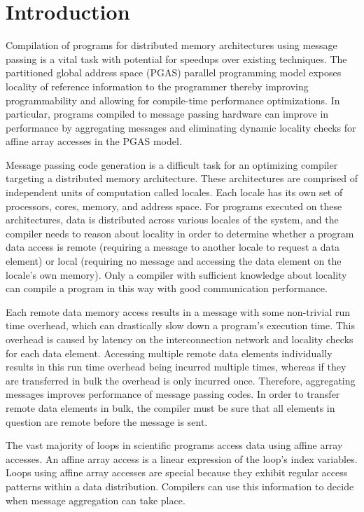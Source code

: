 \section{Introduction}\label{sec:intro} 

Compilation of programs for distributed memory architectures using message passing is a vital task with potential for speedups over existing techniques. The partitioned global address space (PGAS) parallel programming model exposes locality of reference information to the programmer thereby improving programmability and allowing for compile-time performance optimizations. In particular, programs compiled to message passing hardware can improve in performance by aggregating messages and eliminating dynamic locality checks for affine array accesses in the PGAS model. 

Message passing code generation is a difficult task for an optimizing compiler targeting a distributed memory architecture. These architectures are comprised of independent units of computation called locales. Each locale has its own set of processors, cores, memory, and address space. For programs executed on these architectures, data is distributed across various locales of the system, and the compiler needs to reason about locality in order to determine whether a program data access is remote (requiring a message to another locale to request a data element) or local (requiring no message and accessing the data element on the locale's own memory). Only a compiler with sufficient knowledge about locality can compile a program in this way with good communication performance. 

Each remote data memory access results in a message with some non-trivial run time overhead, which can drastically slow down a program's execution time. This overhead is caused by latency on the interconnection network and locality checks for each data element. Accessing multiple remote data elements individually results in this run time overhead being incurred multiple times, whereas if they are transferred in bulk the overhead is only incurred once. Therefore, aggregating messages improves performance of message passing codes. In order to transfer remote data elements in bulk, the compiler must be sure that all elements in question are remote before the message is sent. 

The vast majority of loops in scientific programs access data using affine array accesses. An affine array access is a linear expression of the loop's index variables. Loops using affine array accesses are special because they exhibit regular access patterns within a data distribution. Compilers can use this information to decide when message aggregation can take place. 

